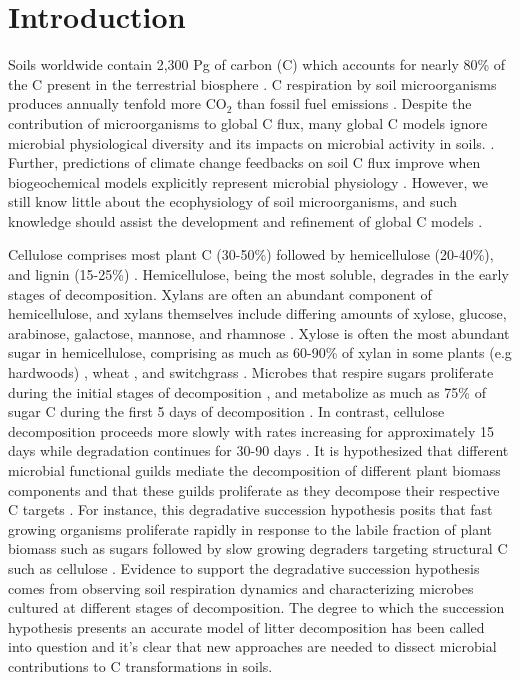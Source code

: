 \section{Introduction}
Soils worldwide contain 2,300 Pg of carbon (C) which accounts for nearly 80\%
of the C present in the terrestrial biosphere
\citep{Amundson_2001,BATJES_1996}. C respiration by soil microorganisms
produces annually tenfold more CO$_{2}$ than fossil fuel emissions
\citep{chapin2002principles}. Despite the contribution of microorganisms to
global C flux, many global C models ignore microbial
physiological diversity and its impacts on microbial activity in soils.
\citep{Allison2010,Six2006,Treseder2011}. Further, predictions of climate
change feedbacks on soil C flux improve when biogeochemical models explicitly
represent microbial physiology \citep{Wieder2013}. However, we still know
little about the ecophysiology of soil microorganisms, and such knowledge
should assist the development and refinement of global C models
\citep{Bradford2008,Neff_2001,McGuire2010}.

Cellulose comprises most plant C (30-50\%) followed by hemicellulose (20-40\%),
and lignin (15-25\%) \citep{Lynd2002}. Hemicellulose, being the most soluble,
degrades in the early stages of decomposition. Xylans are often an abundant
component of hemicellulose, and xylans themselves include differing amounts of
xylose, glucose, arabinose, galactose, mannose, and rhamnose \citep{Saha2003}.
Xylose is often the most abundant sugar in hemicellulose, comprising as much as
60-90\% of xylan in some plants (e.g hardwoods) \citep{Spiridon2008}, wheat
\citep{Sun2005}, and switchgrass \citep{Bunnell2013}. Microbes that respire
sugars proliferate during the initial stages of decomposition
\citep{Garrett1951,Alexander1964}, and metabolize as much as 75\% of sugar
C during the first 5 days of decomposition \citep{Engelking2007}. In contrast,
cellulose decomposition proceeds more slowly with rates increasing for
approximately 15 days while degradation continues for 30-90 days
\citep{Hu1997,Engelking2007}. It is hypothesized that different microbial
functional guilds mediate the decomposition of different plant biomass
components and that these guilds proliferate as they decompose their respective
C targets \citep{Hu1997,Rui2009,AnneliseHKjoller2002,Bastian2009}. For
instance, this degradative succession hypothesis posits that fast growing
organisms proliferate rapidly in response to the labile fraction of plant
biomass such as sugars \citep{Garrett1963,Bremer1994} followed by slow growing
degraders targeting structural C such as cellulose \citep{Garrett1963}.
Evidence to support the degradative succession hypothesis comes from observing
soil respiration dynamics and characterizing microbes cultured at different
stages of decomposition. The degree to which the succession hypothesis presents
an accurate model of litter decomposition has been called into question
\citep{AnneliseHKjoller2002,Frankland1998,Osono_2005} and it's clear that new
approaches are needed to dissect microbial contributions to C transformations
in soils.

